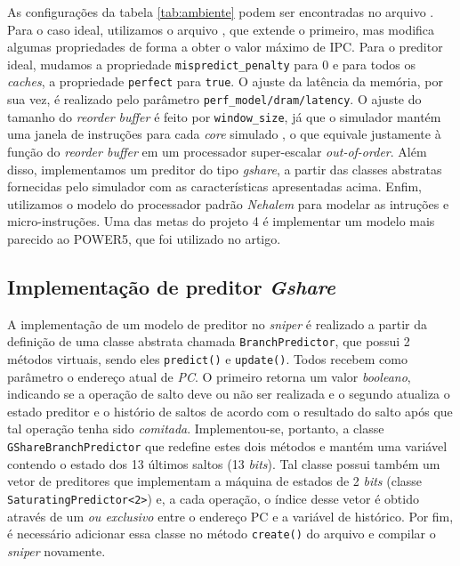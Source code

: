 \documentclass[12pt]{article}
\begin{document}
As configurações da tabela \ref{tab:ambiente} podem ser encontradas no arquivo
. Para o caso ideal, utilizamos o arquivo
, que extende o primeiro, mas modifica algumas
propriedades de forma a obter o valor máximo de IPC. Para o preditor ideal,
mudamos a propriedade \texttt{mispredict\_penalty} para 0 e para todos os
\textit{caches}, a propriedade \texttt{perfect} para \texttt{true}. O ajuste da
latência da memória, por sua vez, é realizado pelo parâmetro
\texttt{perf\_model/dram/latency}. O ajuste do tamanho do \textit{reorder
buffer} é feito por \texttt{window\_size}, já que o simulador
mantém uma janela de instruções para cada \textit{core} simulado
\cite{interval}, o que equivale justamente à função do \textit{reorder buffer}
em um processador super-escalar \textit{out-of-order}. Além disso, implementamos um
preditor do tipo \textit{gshare}, a partir das classes abstratas fornecidas
pelo simulador com as características apresentadas acima. Enfim, utilizamos o
modelo do processador padrão \textit{Nehalem} para modelar as intruções e
micro-instruções. Uma das metas do projeto 4 é implementar um modelo mais
parecido ao POWER5, que foi utilizado no artigo.

\subsection{Implementação de preditor \textit{Gshare}}

A implementação de um modelo de preditor no \textit{sniper} é realizado a partir
da definição de uma classe abstrata chamada \texttt{BranchPredictor}, que possui
2 métodos virtuais, sendo eles \texttt{predict()} e \texttt{update()}.
Todos recebem como parâmetro o endereço atual de \textit{PC}. O primeiro retorna
um valor \textit{booleano}, indicando se a operação de salto deve ou não ser
realizada e o segundo atualiza o estado preditor e o histório de saltos de
acordo com o resultado do salto após que tal operação tenha sido
\textit{comitada}. Implementou-se, portanto, a classe
\texttt{GShareBranchPredictor} que redefine estes dois métodos e mantém uma
variável contendo o estado dos 13 últimos saltos (13 \textit{bits}). Tal classe
possui também um vetor de preditores que implementam a máquina de estados de 2
\textit{bits} (classe \texttt{SaturatingPredictor<2>}) e, a cada operação, o
índice desse vetor é obtido através de um \textit{ou exclusivo} entre o endereço
PC e a variável de histórico. Por fim, é necessário adicionar essa classe no
método \texttt{create()} do arquivo  e compilar o
\textit{sniper} novamente.
\end{document}
